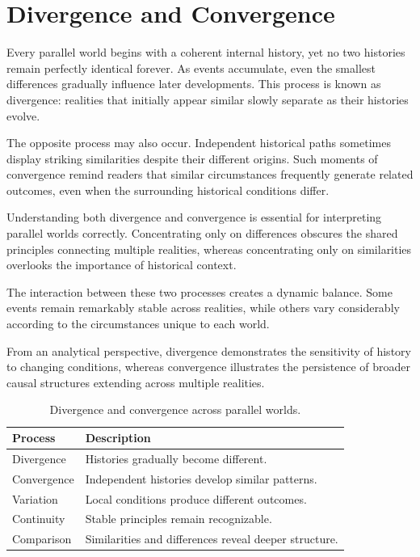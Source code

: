 \documentclass[12pt,oneside,openany]{book}
\begin{document}
\section{Divergence and Convergence}

Every parallel world begins with a coherent internal history, yet no two
histories remain perfectly identical forever. As events accumulate, even the
smallest differences gradually influence later developments. This process is
known as divergence: realities that initially appear similar slowly separate as
their histories evolve.

The opposite process may also occur. Independent historical paths sometimes
display striking similarities despite their different origins. Such moments of
convergence remind readers that similar circumstances frequently generate
related outcomes, even when the surrounding historical conditions differ.

Understanding both divergence and convergence is essential for interpreting
parallel worlds correctly. Concentrating only on differences obscures the
shared principles connecting multiple realities, whereas concentrating only on
similarities overlooks the importance of historical context.

The interaction between these two processes creates a dynamic balance. Some
events remain remarkably stable across realities, while others vary
considerably according to the circumstances unique to each world.

From an analytical perspective, divergence demonstrates the sensitivity of
history to changing conditions, whereas convergence illustrates the persistence
of broader causal structures extending across multiple realities.

\begin{table}[H]
\centering
\begin{tabular}{|p{4.2cm}|p{7.8cm}|}
\hline
\textbf{Process} & \textbf{Description}\\
\hline
Divergence & Histories gradually become different.\\
\hline
Convergence & Independent histories develop similar patterns.\\
\hline
Variation & Local conditions produce different outcomes.\\
\hline
Continuity & Stable principles remain recognizable.\\
\hline
Comparison & Similarities and differences reveal deeper structure.\\
\hline
\end{tabular}
\caption{Divergence and convergence across parallel worlds.}
\end{table}
\end{document}
